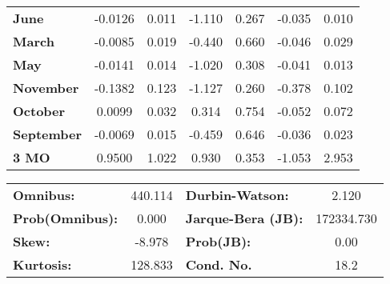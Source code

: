 \begin{center}
\begin{tabular}{lcccccc}
\textbf{June}      &      -0.0126  &        0.011     &    -1.110  &         0.267        &       -0.035    &        0.010     \\
\textbf{March}     &      -0.0085  &        0.019     &    -0.440  &         0.660        &       -0.046    &        0.029     \\
\textbf{May}       &      -0.0141  &        0.014     &    -1.020  &         0.308        &       -0.041    &        0.013     \\
\textbf{November}  &      -0.1382  &        0.123     &    -1.127  &         0.260        &       -0.378    &        0.102     \\
\textbf{October}   &       0.0099  &        0.032     &     0.314  &         0.754        &       -0.052    &        0.072     \\
\textbf{September} &      -0.0069  &        0.015     &    -0.459  &         0.646        &       -0.036    &        0.023     \\
\textbf{3 MO}      &       0.9500  &        1.022     &     0.930  &         0.353        &       -1.053    &        2.953     \\
\bottomrule
\end{tabular}
\begin{tabular}{lclc}
\textbf{Omnibus:}       & 440.114 & \textbf{  Durbin-Watson:     } &     2.120   \\
\textbf{Prob(Omnibus):} &   0.000 & \textbf{  Jarque-Bera (JB):  } & 172334.730  \\
\textbf{Skew:}          &  -8.978 & \textbf{  Prob(JB):          } &      0.00   \\
\textbf{Kurtosis:}      & 128.833 & \textbf{  Cond. No.          } &      18.2   \\
\bottomrule
\end{tabular}
\end{center}

